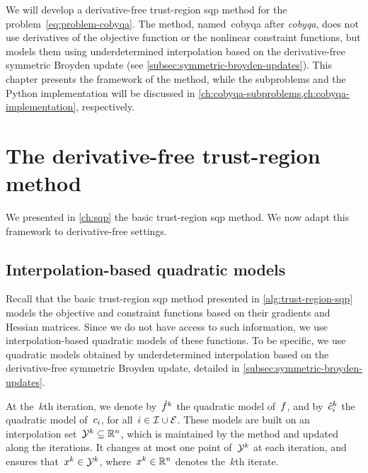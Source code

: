 We will develop a derivative-free trust-region \gls{sqp} method for the problem~\cref{eq:problem-cobyqa}.
The method, named~\gls{cobyqa} after \emph{\glsdesc{cobyqa}}, does not use derivatives of the objective function or the nonlinear constraint functions, but models them using underdetermined interpolation based on the derivative-free symmetric Broyden update (see \cref{subsec:symmetric-broyden-updates}).
This chapter presents the framework of the method, while the subproblems and the Python implementation will be discussed in \cref{ch:cobyqa-subproblems,ch:cobyqa-implementation}, respectively.

\section{The derivative-free trust-region  method}

We presented in \cref{ch:sqp} the basic trust-region \gls{sqp} method.
We now adapt this framework to derivative-free settings.

\subsection{Interpolation-based quadratic models}
\label{subsec:interpolation-based-quadratic-models}

Recall that the basic trust-region \gls{sqp} method presented in \cref{alg:trust-region-sqp} models the objective and constraint functions based on their gradients and Hessian matrices.
Since we do not have access to such information, we use interpolation-based quadratic models of these functions.
To be specific, we use quadratic models obtained by underdetermined interpolation based on the derivative-free symmetric Broyden update, detailed in \cref{subsec:symmetric-broyden-updates}.

At the~$k$th iteration, we denote by~$\objm[k]$ the quadratic model of~$f$, and by~$\conm[k]{i}$ the quadratic model of~$c_{i}$, for all~$i \in \mathcal{I} \cup \mathcal{E}$.
These models are built on an interpolation set~$\xpt[k] \subseteq \R^n$, which is maintained by the method and updated along the iterations.
It changes at most one point of~$\xpt[k]$ at each iteration, and ensures that~$\iter[k] \in \xpt[k]$, where~$\iter[k] \in \R^n$ denotes the~$k$th iterate.

